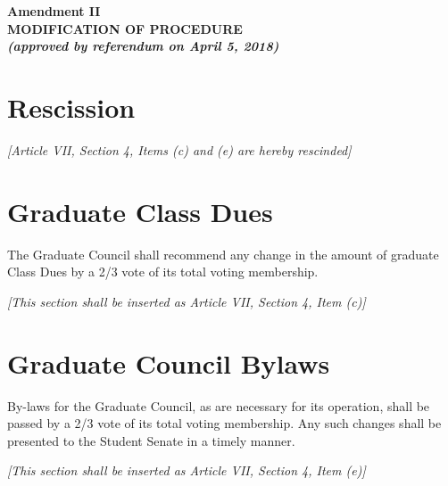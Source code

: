 \setcounter{section}{0}

\vspace{20pt}

\begin{center}
    \textbf{Amendment II \\ MODIFICATION OF PROCEDURE \\ \textit{\footnotesize (approved by referendum on April 5, 2018)}}
\end{center}

\section{Rescission}

\textit{[Article VII, Section 4, Items (c) and (e) are hereby rescinded]}

\section{Graduate Class Dues}

The Graduate Council shall recommend any change in the amount of graduate Class Dues by a 2/3 vote of its total voting membership.

\vspace{12pt}

\textit{[This section shall be inserted as Article VII, Section 4, Item (c)]}

\section{Graduate Council Bylaws}

By-laws for the Graduate Council, as are necessary for its operation, shall be passed by a 2/3 vote of its total voting membership. Any such changes shall be presented to the Student Senate in a timely manner.

\vspace{12pt}

\textit{[This section shall be inserted as Article VII, Section 4, Item (e)]}
